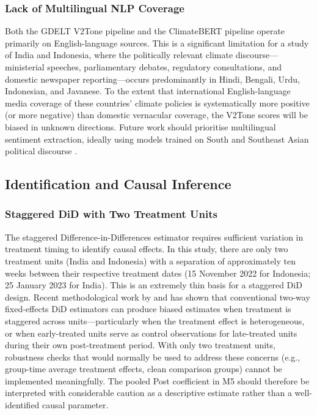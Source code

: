 \documentclass[12pt,a4paper]{article}
\begin{document}
\subsubsection{Lack of Multilingual NLP Coverage}

Both the GDELT V2Tone pipeline and the ClimateBERT pipeline operate primarily on English-language sources. This is a significant limitation for a study of India and Indonesia, where the politically relevant climate discourse---ministerial speeches, parliamentary debates, regulatory consultations, and domestic newspaper reporting---occurs predominantly in Hindi, Bengali, Urdu, Indonesian, and Javanese. To the extent that international English-language media coverage of these countries' climate policies is systematically more positive (or more negative) than domestic vernacular coverage, the V2Tone scores will be biased in unknown directions. Future work should prioritise multilingual sentiment extraction, ideally using models trained on South and Southeast Asian political discourse \citep{Webersinke2022}.

\subsection{Identification and Causal Inference}

\subsubsection{Staggered DiD with Two Treatment Units}

The staggered Difference-in-Differences estimator requires sufficient variation in treatment timing to identify causal effects. In this study, there are only two treatment units (India and Indonesia) with a separation of approximately ten weeks between their respective treatment dates (15 November 2022 for Indonesia; 25 January 2023 for India). This is an extremely thin basis for a staggered DiD design. Recent methodological work by \citet{Callaway2021} and \citet{Goodman-Bacon2021} has shown that conventional two-way fixed-effects DiD estimators can produce biased estimates when treatment is staggered across units---particularly when the treatment effect is heterogeneous, or when early-treated units serve as control observations for late-treated units during their own post-treatment period. With only two treatment units, robustness checks that would normally be used to address these concerns (e.g., group-time average treatment effects, clean comparison groups) cannot be implemented meaningfully. The pooled Post coefficient in M5 should therefore be interpreted with considerable caution as a descriptive estimate rather than a well-identified causal parameter.
\end{document}
